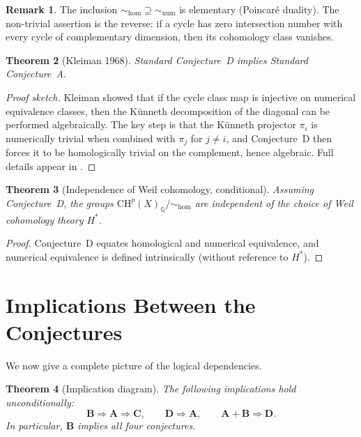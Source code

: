 \documentclass[12pt,a4paper]{amsart}
\newtheorem{theorem}{Theorem}[section]
\theoremstyle{definition}
\newtheorem{remark}[theorem]{Remark}
\newcommand{\Q}{\mathbb{Q}}
\newcommand{\CH}{\mathrm{CH}}
\begin{document}
\begin{remark}
The inclusion ${\sim_{\mathrm{hom}}} \supseteq {\sim_{\mathrm{num}}}$ is
elementary (Poincar\'e duality).  The non-trivial assertion is the reverse:
if a cycle has zero intersection number with every cycle of complementary
dimension, then its cohomology class vanishes.
\end{remark}

\begin{theorem}[Kleiman 1968]\label{thm:D_implies_A}
Standard Conjecture~D implies Standard Conjecture~A.
\end{theorem}

\begin{proof}[Proof sketch]
Kleiman showed that if the cycle class map is injective on numerical
equivalence classes, then the K\"unneth decomposition of the diagonal can
be performed algebraically.  The key step is that the K\"unneth projector
$\pi_i$ is numerically trivial when combined with $\pi_j$ for $j \neq i$,
and Conjecture~D then forces it to be homologically trivial on the complement,
hence algebraic.  Full details appear in \cite{kleiman1968}.
\end{proof}

\begin{theorem}[Independence of Weil cohomology, conditional]\label{thm:independence}
Assuming Conjecture~D, the groups $\CH^p(X)_\Q/{\sim_{\mathrm{hom}}}$ are
independent of the choice of Weil cohomology theory $H^*$.
\end{theorem}

\begin{proof}
Conjecture~D equates homological and numerical equivalence, and numerical
equivalence is defined intrinsically (without reference to $H^*$).
\end{proof}

\section{Implications Between the Conjectures}\label{sec:implications}

We now give a complete picture of the logical dependencies.

\begin{theorem}[Implication diagram]\label{thm:implications}
The following implications hold unconditionally:
\[
  \mathbf{B} \Rightarrow \mathbf{A} \Rightarrow \mathbf{C},
  \qquad
  \mathbf{D} \Rightarrow \mathbf{A},
  \qquad
  \mathbf{A} + \mathbf{B} \Rightarrow \mathbf{D}.
\]
In particular, $\mathbf{B}$ implies all four conjectures.
\end{theorem}
\end{document}
